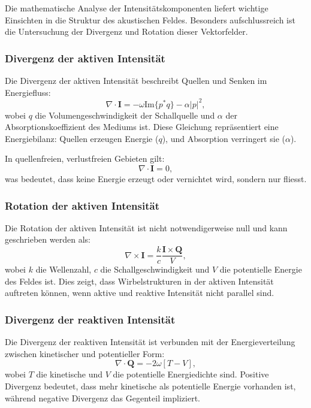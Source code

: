 Die mathematische Analyse der Intensitätskomponenten liefert wichtige
Einsichten in die Struktur des akustischen Feldes.
Besonders aufschlussreich ist die Untersuchung der Divergenz und
Rotation dieser Vektorfelder.

\subsubsection{Divergenz der aktiven Intensität}

Die Divergenz der aktiven Intensität beschreibt Quellen und Senken im Energiefluss:
\begin{equation}
\nabla \cdot \boldsymbol{I} = -\omega\text{Im}\{p^*q\} - \alpha|p|^2,
\end{equation}
wobei $q$ die Volumengeschwindigkeit der Schallquelle und $\alpha$ der Absorptionskoeffizient des Mediums ist.
Diese Gleichung repräsentiert eine Energiebilanz: Quellen erzeugen Energie ($q$), und Absorption verringert sie ($\alpha$).

In quellenfreien, verlustfreien Gebieten gilt:
\begin{equation}
\nabla \cdot \boldsymbol{I} = 0,
\end{equation}
was bedeutet, dass keine Energie erzeugt oder vernichtet wird, sondern nur fliesst.

\subsubsection{Rotation der aktiven Intensität}

Die Rotation der aktiven Intensität ist nicht notwendigerweise null und kann geschrieben werden als:
\begin{equation}
\nabla \times \boldsymbol{I} = \frac{k}{c} \frac{\boldsymbol{I} \times \boldsymbol{Q}}{V},
\end{equation}
wobei $k$ die Wellenzahl, $c$ die Schallgeschwindigkeit und $V$ die potentielle Energie des Feldes ist.
Dies zeigt, dass Wirbelstrukturen in der aktiven Intensität auftreten können, wenn aktive und reaktive Intensität nicht parallel sind.

\subsubsection{Divergenz der reaktiven Intensität}

Die Divergenz der reaktiven Intensität ist verbunden mit der Energieverteilung zwischen kinetischer und potentieller Form:
\begin{equation}
\nabla \cdot \boldsymbol{Q} = -2 \omega [T-V],
\end{equation}
wobei $T$ die kinetische und $V$ die potentielle Energiedichte sind.
Positive Divergenz bedeutet, dass mehr kinetische als potentielle Energie vorhanden ist, während negative Divergenz das Gegenteil impliziert.

